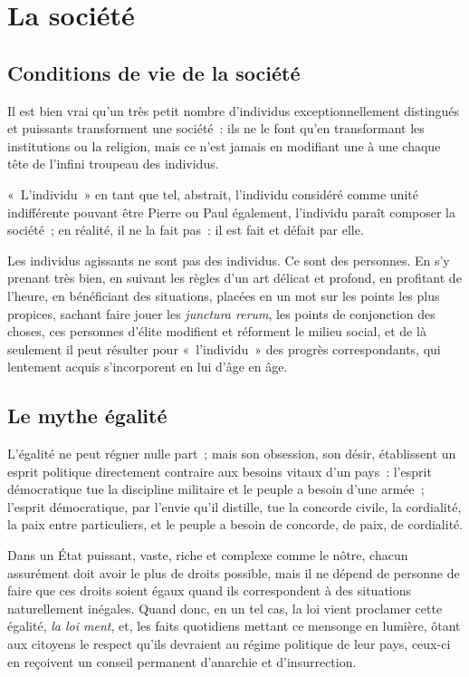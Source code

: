 \documentclass[french,twoside]{book} %
\newcommand{\astermono}{\medskip\centerline{\color{rubric}\large\selectfont{\syms ✻}}\medskip\par}%
\begin{document}
\section[La société]{La société}
\subsection[Conditions de vie de la société]{Conditions de vie de la société}
\noindent Il est bien vrai qu’un très petit nombre d’individus exceptionnellement distingués et puissants transforment une société : ils ne le font qu’en transformant les institutions ou la religion, mais ce n’est jamais en modifiant une à une chaque tête de l’infini troupeau des individus.\par
« L’individu » en tant que tel, abstrait, l’individu considéré comme unité indifférente pouvant être Pierre ou Paul également, l’individu paraît composer la société ; en réalité, il ne la fait pas : il est fait et défait par elle.\par
Les individus agissants ne sont pas des individus. Ce sont des personnes. En s’y prenant très bien, en suivant les règles d’un art délicat et profond, en profitant de l’heure, en bénéficiant des situations, placées en un mot sur les points les plus propices, sachant faire jouer les \emph{junctura rerum}, les points de conjonction des choses, ces personnes d’élite modifient et réforment le milieu social, et de là seulement il peut résulter pour « l’individu » des progrès correspondants, qui lentement acquis s’incorporent en lui d’âge en âge.\par

\astermono

\subsection[Le mythe égalité]{Le mythe égalité}
\noindent L’égalité ne peut régner nulle part ; mais son obsession, son désir, établissent un esprit politique directement contraire aux besoins vitaux d’un pays : l’esprit démocratique tue la discipline militaire et le peuple a besoin d’une armée ; l’esprit démocratique, par l’envie qu’il distille, tue la concorde civile, la cordialité, la paix entre particuliers, et le peuple a besoin de concorde, de paix, de cordialité.\par

\astermono

\noindent Dans un État puissant, vaste, riche et complexe comme le nôtre, chacun assurément doit avoir le plus de droits possible, mais il ne dépend de personne de faire que ces droits soient égaux quand ils correspondent à des situations naturellement inégales. Quand donc, en un tel cas, la loi vient proclamer cette égalité, \emph{la loi ment}, et, les faits quotidiens mettant ce mensonge en lumière, ôtant aux citoyens le respect qu’ils devraient au régime politique de leur pays, ceux-ci en reçoivent un conseil permanent d’anarchie et d’insurrection.\par
\end{document}
